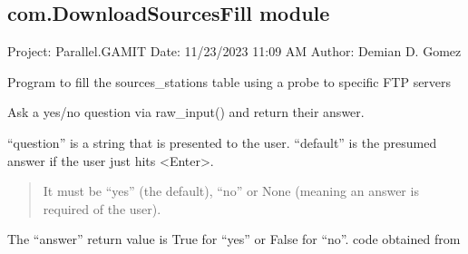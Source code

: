 \documentclass[letterpaper,10pt,english]{sphinxmanual}
\begin{document}
\subsection{com.DownloadSourcesFill module}
\label{\detokenize{com:module-com.DownloadSourcesFill}}\label{\detokenize{com:com-downloadsourcesfill-module}}
\sphinxAtStartPar
Project: Parallel.GAMIT
Date: 11/23/2023 11:09 AM
Author: Demian D. Gomez

\sphinxAtStartPar
Program to fill the sources\_stations table using a probe to specific FTP servers

\begin{fulllineitems}
\label{\detokenize{com:com.DownloadSourcesFill.main}}
\pysigstartsignatures
{}
\pysigstopsignatures
\end{fulllineitems}


\begin{fulllineitems}
\label{\detokenize{com:com.DownloadSourcesFill.query_yes_no}}
\pysigstartsignatures
{}
\pysigstopsignatures
\sphinxAtStartPar
Ask a yes/no question via raw\_input() and return their answer.

\sphinxAtStartPar
“question” is a string that is presented to the user.
“default” is the presumed answer if the user just hits \textless{}Enter\textgreater{}.
\begin{quote}

\sphinxAtStartPar
It must be “yes” (the default), “no” or None (meaning
an answer is required of the user).
\end{quote}

\sphinxAtStartPar
The “answer” return value is True for “yes” or False for “no”.
code obtained from 

\end{fulllineitems}
\end{document}
